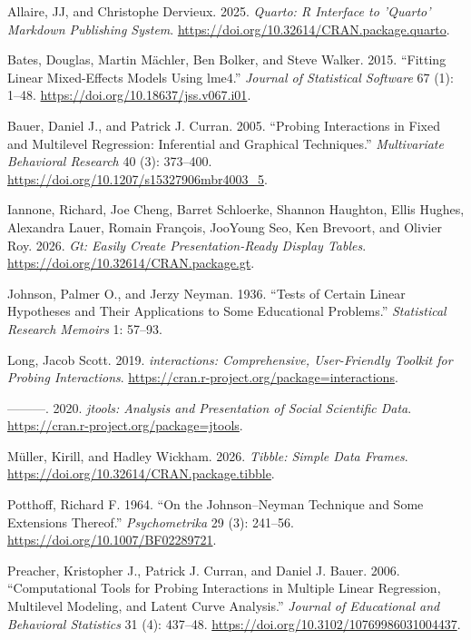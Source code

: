 \documentclass[
  letterpaper,
  DIV=11,
  numbers=noendperiod]{scrartcl}
\newlength{\cslhangindent}
\newenvironment{CSLReferences}[2] %
 {\begin{list}{}{%
  \setlength{\itemindent}{0pt}
  \setlength{\leftmargin}{0pt}
  \setlength{\parsep}{0pt}
  \ifodd #1
   \setlength{\leftmargin}{\cslhangindent}
   \setlength{\itemindent}{-1\cslhangindent}
  \fi
  \setlength{\itemsep}{#2\baselineskip}}}
 {\end{list}}
\begin{document}
\label{refs}
\begin{CSLReferences}{1}{0}
Allaire, JJ, and Christophe Dervieux. 2025. \emph{Quarto: R Interface to
'Quarto' Markdown Publishing System}.
\url{https://doi.org/10.32614/CRAN.package.quarto}.

Bates, Douglas, Martin Mächler, Ben Bolker, and Steve Walker. 2015.
{``Fitting Linear Mixed-Effects Models Using {lme4}.''} \emph{Journal of
Statistical Software} 67 (1): 1--48.
\url{https://doi.org/10.18637/jss.v067.i01}.

Bauer, Daniel J., and Patrick J. Curran. 2005. {``Probing Interactions
in Fixed and Multilevel Regression: Inferential and Graphical
Techniques.''} \emph{Multivariate Behavioral Research} 40 (3): 373--400.
\url{https://doi.org/10.1207/s15327906mbr4003_5}.

Iannone, Richard, Joe Cheng, Barret Schloerke, Shannon Haughton, Ellis
Hughes, Alexandra Lauer, Romain François, JooYoung Seo, Ken Brevoort,
and Olivier Roy. 2026. \emph{Gt: Easily Create Presentation-Ready
Display Tables}. \url{https://doi.org/10.32614/CRAN.package.gt}.

Johnson, Palmer O., and Jerzy Neyman. 1936. {``Tests of Certain Linear
Hypotheses and Their Applications to Some Educational Problems.''}
\emph{Statistical Research Memoirs} 1: 57--93.

Long, Jacob Scott. 2019. \emph{{interactions}: Comprehensive,
User-Friendly Toolkit for Probing Interactions}.
\url{https://cran.r-project.org/package=interactions}.

---------. 2020. \emph{{jtools}: Analysis and Presentation of Social
Scientific Data}. \url{https://cran.r-project.org/package=jtools}.

Müller, Kirill, and Hadley Wickham. 2026. \emph{Tibble: Simple Data
Frames}. \url{https://doi.org/10.32614/CRAN.package.tibble}.

Potthoff, Richard F. 1964. {``On the {Johnson--Neyman} Technique and
Some Extensions Thereof.''} \emph{Psychometrika} 29 (3): 241--56.
\url{https://doi.org/10.1007/BF02289721}.

Preacher, Kristopher J., Patrick J. Curran, and Daniel J. Bauer. 2006.
{``Computational Tools for Probing Interactions in Multiple Linear
Regression, Multilevel Modeling, and Latent Curve Analysis.''}
\emph{Journal of Educational and Behavioral Statistics} 31 (4): 437--48.
\url{https://doi.org/10.3102/10769986031004437}.


\end{CSLReferences}
\end{document}
